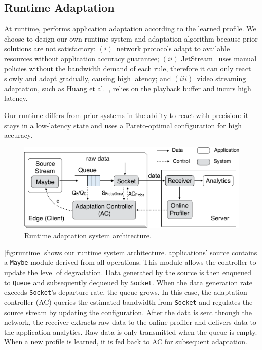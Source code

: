 \subsection{Runtime Adaptation}
\label{sec:runtime}

At runtime, \sysname{} performs application adaptation according to the learned
profile. We choose to design our own runtime system and adaptation algorithm
because prior solutions are not satisfactory: $(i)$~network protocols adapt to
available resources without application accuracy guarantee; $(ii)$
JetStream~\cite{rabkin2014aggregation} uses manual policies without the
bandwidth demand of each rule, therefore it can only react slowly and adapt
gradually, causing high latency; and $(iii)$~video streaming adaptation, such as
Huang et al.~\cite{huang2014buffer}, relies on the playback buffer and incurs
high latency.

Our runtime differs from prior systems in the ability to react
with precision: it stays in a low-latency state and uses a Pareto-optimal
configuration for high accuracy.

\begin{figure}
  \centering
  \includegraphics[width=\linewidth]{figures/runtime-adaptation.pdf}
  \caption{Runtime adaptation system architecture.}
  \label{fig:runtime}
\end{figure}

\autoref{fig:runtime} shows our runtime system architecture. \sysname{}
applications' source contains a \texttt{Maybe} module derived from all \maybe{}
operations. This module allows the controller to update the level of
degradation. Data generated by the source is then enqueued to \texttt{Queue} and
subsequently dequeued by \texttt{Socket}. When the data generation rate exceeds
\texttt{Socket}'s departure rate, the queue grows. In this case, the adaptation
controller (AC) queries the estimated bandwidth from \texttt{Socket} and
regulates the source stream by updating the configuration.  After the data is
sent through the network, the receiver extracts raw data to the online profiler
and delivers data to the application analytics. Raw data is only transmitted
when the queue is empty. When a new profile is learned, it is fed back to AC for
subsequent adaptation.

